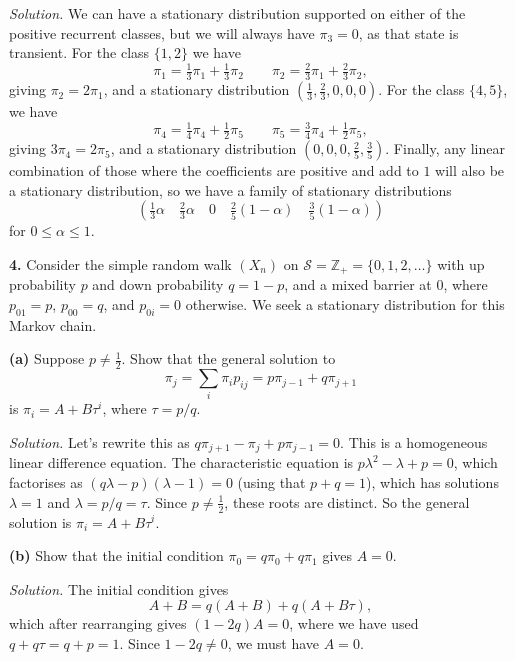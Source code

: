 \documentclass[
  a4paper,
]{article}
\theoremstyle{definition}
\theoremstyle{definition}
\theoremstyle{definition}
\theoremstyle{remark}
\begin{document}
\begin{myanswers}
\emph{Solution.} We can have a stationary distribution supported on either of the positive recurrent classes, but we will always have \(\pi_3 = 0\), as that state is transient. For the class \(\{1,2\}\) we have
\[ \pi_1 = \tfrac13\pi_1 + \tfrac13\pi_2 \qquad \pi_2 = \tfrac23\pi_1 + \tfrac23\pi_2 , \]
giving \(\pi_2 = 2\pi_1\), and a stationary distribution \((\tfrac 13, \tfrac23, 0, 0, 0)\). For the class \(\{4,5\}\), we have
\[ \pi_4 = \tfrac14\pi_4 + \tfrac12\pi_5 \qquad \pi_5 = \tfrac34\pi_4 + \tfrac12\pi_5 , \]
giving \(3\pi_4 = 2\pi_5\), and a stationary distribution \((0,0,0,\frac25,\frac35)\). Finally, any linear combination of those where the coefficients are positive and add to \(1\) will also be a stationary distribution, so we have a family of stationary distributions
\[ \left( \tfrac13\alpha \quad \tfrac23\alpha \quad 0 \quad \tfrac25(1-\alpha) \quad \tfrac35(1-\alpha) \right)    \]
for \(0 \leq \alpha \leq 1\).

\end{myanswers}

\textbf{4.} Consider the simple random walk \((X_n)\) on \(\mathcal S = \mathbb Z_+ = \{0,1,2,\dots\}\) with up probability \(p\) and down probability \(q = 1-p\), and a mixed barrier at \(0\), where \(p_{01} = p\), \(p_{00} = q\), and \(p_{0i} = 0\) otherwise. We seek a stationary distribution for this Markov chain.

\textbf{(a)} Suppose \(p \neq \frac12\). Show that the general solution to
\[ \pi_j = \sum_i \pi_i p_{ij} = p\pi_{j-1} + q\pi_{j+1} \]
is \(\pi_i = A + B\tau^i\), where \(\tau = p/q\).

\begin{myanswers}
\emph{Solution.} Let's rewrite this as \(q\pi_{j+1} - \pi_j + p\pi_{j-1} = 0\). This is a homogeneous linear difference equation. The characteristic equation is \(p\lambda^2 - \lambda + p = 0\), which factorises as \((q\lambda - p)(\lambda-1) = 0\) (using that \(p + q = 1\)), which has solutions \(\lambda = 1\) and \(\lambda = p/q = \tau\). Since \(p \neq \frac12\), these roots are distinct. So the general solution is \(\pi_i = A + B\tau^i\).

\end{myanswers}

\textbf{(b)} Show that the initial condition \(\pi_0 = q\pi_0 + q\pi_1\) gives \(A = 0\).

\begin{myanswers}
\emph{Solution.} The initial condition gives
\[ A + B = q(A + B) + q(A + B\tau)  ,\]
which after rearranging gives \((1-2q)A = 0\), where we have used \(q + q\tau = q + p = 1\). Since \(1-2q\neq 0\), we must have \(A = 0\).

\end{myanswers}
\end{document}
